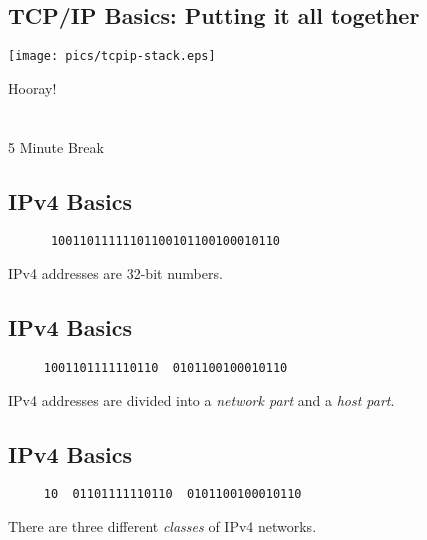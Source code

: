 \documentclass[xga]{xdvislides}
\begin{document}
\subsection{TCP/IP Basics: Putting it all together}
\vspace*{\fill}
\begin{center}
	\texttt{[image: pics/tcpip-stack.eps]}
\end{center}
\vspace*{\fill}


\newpage
\vspace*{\fill}
\begin{center}
    \Hugesize
        Hooray! \\ [1em]
    \hspace*{5mm}
    \blueline\\
    \hspace*{5mm}\\
        5 Minute Break
\end{center}
\vspace*{\fill}

\subsection{IPv4 Basics}
\vspace{.5in}
\Hugesize
\begin{center}
\begin{verbatim}
      10011011111101100101100100010110
\end{verbatim}
\vspace{.5in}
IPv4 addresses are 32-bit numbers.
\end{center}
\Normalsize

\subsection{IPv4 Basics}
\vspace{.5in}
\Hugesize
\begin{center}
\begin{verbatim}
     1001101111110110  0101100100010110
\end{verbatim}
\vspace{.5in}
IPv4 addresses are divided into a {\em network part} and a {\em host part}.
\end{center}
\Normalsize

\subsection{IPv4 Basics}
\vspace{.5in}
\Hugesize
\begin{center}
\begin{verbatim}
     10  01101111110110  0101100100010110
\end{verbatim}
\vspace{.5in}
There are three different {\em classes} of IPv4 networks.
\end{center}
\Normalsize
\end{document}
